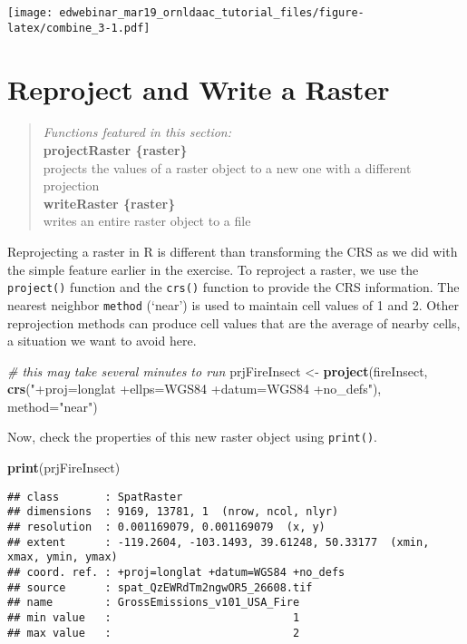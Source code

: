 \documentclass[
]{article}
\newenvironment{Shaded}{\begin{snugshade}}{\end{snugshade}}
\newcommand{\AttributeTok}[1]{\textcolor[rgb]{0.13,0.29,0.53}{#1}}
\newcommand{\CommentTok}[1]{\textcolor[rgb]{0.56,0.35,0.01}{\textit{#1}}}
\newcommand{\FunctionTok}[1]{\textcolor[rgb]{0.13,0.29,0.53}{\textbf{#1}}}
\newcommand{\NormalTok}[1]{#1}
\newcommand{\OtherTok}[1]{\textcolor[rgb]{0.56,0.35,0.01}{#1}}
\newcommand{\StringTok}[1]{\textcolor[rgb]{0.31,0.60,0.02}{#1}}
\begin{document}
\texttt{[image: edwebinar\_mar19\_ornldaac\_tutorial\_files/figure-latex/combine\_3-1.pdf]}

\hypertarget{reproject-and-write-a-raster}{%
\section{Reproject and Write a
Raster}\label{reproject-and-write-a-raster}}

\begin{quote}
\emph{Functions featured in this section:}\\
\textbf{projectRaster \{raster\}}\\
projects the values of a raster object to a new one with a different
projection\\
\textbf{writeRaster \{raster\}}\\
writes an entire raster object to a file
\end{quote}

Reprojecting a raster in R is different than transforming the CRS as we
did with the simple feature earlier in the exercise. To reproject a
raster, we use the \texttt{project()} function and the \texttt{crs()}
function to provide the CRS information. The nearest neighbor
\texttt{method} (`near') is used to maintain cell values of 1 and 2.
Other reprojection methods can produce cell values that are the average
of nearby cells, a situation we want to avoid here.

\begin{Shaded}
\begin{Highlighting}[]
\CommentTok{\# this may take several minutes to run }
\NormalTok{prjFireInsect }\OtherTok{\textless{}{-}} \FunctionTok{project}\NormalTok{(fireInsect, }
                         \FunctionTok{crs}\NormalTok{(}\StringTok{"+proj=longlat +ellps=WGS84 +datum=WGS84 +no\_defs"}\NormalTok{),}
                         \AttributeTok{method=}\StringTok{"near"}\NormalTok{) }
\end{Highlighting}
\end{Shaded}

Now, check the properties of this new raster object using
\texttt{print()}.

\begin{Shaded}
\begin{Highlighting}[]
\FunctionTok{print}\NormalTok{(prjFireInsect) }
\end{Highlighting}
\end{Shaded}

\begin{verbatim}
## class       : SpatRaster 
## dimensions  : 9169, 13781, 1  (nrow, ncol, nlyr)
## resolution  : 0.001169079, 0.001169079  (x, y)
## extent      : -119.2604, -103.1493, 39.61248, 50.33177  (xmin, xmax, ymin, ymax)
## coord. ref. : +proj=longlat +datum=WGS84 +no_defs 
## source      : spat_QzEWRdTm2ngwOR5_26608.tif 
## name        : GrossEmissions_v101_USA_Fire 
## min value   :                            1 
## max value   :                            2
\end{verbatim}
\end{document}
